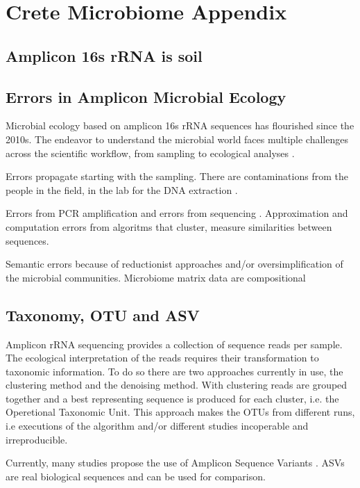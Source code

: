 
\chapter{Crete Microbiome Appendix} %

\label{AppendixD} 

\section{Amplicon 16s rRNA is soil}

\section{Errors in Amplicon Microbial Ecology}

Microbial ecology based on amplicon 16s rRNA sequences has flourished since the
2010s. The endeavor to understand the microbial world faces multiple challenges
across the scientific workflow, from sampling to ecological analyses \parencite{Lee2012}.

Errors propagate starting with the sampling. There are contaminations from the
people in the field, in the lab for the DNA extraction \parencite{EISENHOFER2019105}. 

Errors from PCR amplification and errors from sequencing \parencite{Schloss2011, Schimer2015}.
Approximation and computation errors from algoritms that cluster, measure similarities between
sequences.

Semantic errors because of reductionist approaches and/or oversimplification
of the microbial communities. Microbiome matrix data are compositional \parencite{Gloor2017}

\section{Taxonomy, OTU and ASV}

Amplicon rRNA sequencing provides a collection of sequence reads per sample. 
The ecological interpretation of the reads requires their transformation to
taxonomic information. To do so there are two approaches currently in use, 
the clustering method and the denoising method. With clustering reads are 
grouped together and a best representing sequence is produced for each 
cluster, i.e. the Operetional Taxonomic Unit. This approach makes the OTUs 
from different runs, i.e executions of the algorithm and/or different studies
incoperable and irreproducible.

Currently, many studies propose the use of Amplicon Sequence Variants \parencite{Callahan2017}. 
ASVs are real biological sequences and can be used for comparison.

